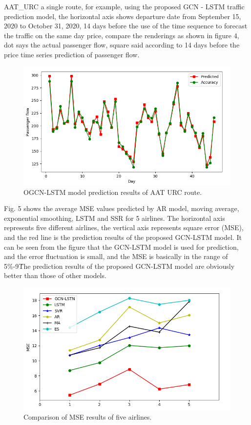 \documentclass[journal,article,submit,moreauthors,pdftex]{Definitions/mdpi}
\begin{document}
\par AAT\_URC a single route, for example, using the proposed GCN - LSTM traffic prediction model, the horizontal axis shows departure date from September 15, 2020 to October 31, 2020, 14 days before the use of the time sequence to forecast the traffic on the same day price, compare the renderings as shown in figure 4, dot says the actual passenger flow, square said according to 14 days before the price time series prediction of passenger flow.
\begin{figure}[htbp]
    \centering
    \includegraphics[width=12 cm]{./imgs/predicted.png}
    \caption{OGCN-LSTM model prediction results of AAT URC route.}
    \label{fig:predicted}
\end{figure}

\par Fig. 5 shows the average MSE values predicted by AR model, moving average, exponential smoothing, LSTM and SSR for 5 airlines. The horizontal axis represents five different airlines, the vertical axis represents square error (MSE), and the red line is the prediction results of the proposed GCN-LSTM model.
It can be seen from the figure that the GCN-LSTM model is used for prediction, and the error fluctuation is small, and the MSE is basically in the range of 5\%-9\. The prediction results of the proposed GCN-LSTM model are obviously better than those of other models.
\begin{figure}[htbp]
    \centering
    \includegraphics[width=12 cm]{./imgs/duibi.png}
    \caption{Comparison of MSE results of five airlines.}
    \label{fig:duibi}
\end{figure}
\end{document}
